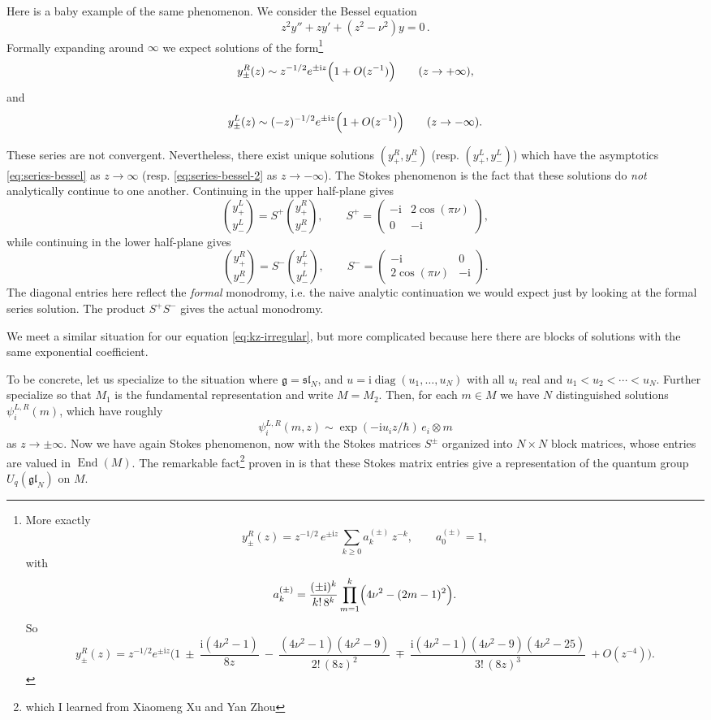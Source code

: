 \documentclass[12pt,letterpaper,reqno]{amsart}
\numberwithin{equation}{section}
\newcommand{\fg}{{\mathfrak g}}
\newcommand{\fgl}{{\mathfrak {gl}}}
\newcommand{\fsl}{{\mathfrak {sl}}}
\newcommand{\I}{{\mathrm i}}
\newcommand{\ti}[1]{\textit{#1}}
\DeclareMathOperator{\End}{End}
\DeclareMathOperator{\diag}{diag}
\begin{document}
Here is a baby example of the same phenomenon. We
consider the Bessel equation
\[
z^{2}y''+zy'+(z^{2}-\nu^{2})y=0 \, .
\]
Formally expanding around $\infty$ we expect solutions of the form\footnote{More exactly
\[
y^R_\pm(z)=z^{-1/2}\,e^{\pm \I z}\,\sum_{k\ge 0} a_k^{(\pm)}\,z^{-k},\qquad a_0^{(\pm)}=1,
\]
with
\[
a_k^{(\pm)}=\frac{(\pm \I)^k}{k!\,8^k}\prod_{m=1}^k\Bigl(4\nu^2-(2m-1)^2\Bigr).
\]
So
\[
y^R_\pm(z)=z^{-1/2}e^{\pm \I z}\Biggl(
1
\ \pm\ \frac{\I(4\nu^2-1)}{8z}
\ -\ \frac{(4\nu^2-1)(4\nu^2-9)}{2!\,(8z)^2}
\ \mp\ \frac{\I(4\nu^2-1)(4\nu^2-9)(4\nu^2-25)}{3!\,(8z)^3}
\ + O(z^{-4})
\Biggr).
\]
}
\[ \label{eq:series-bessel}
y^{R}_{\pm}(z)\sim z^{-1/2}e^{\pm \I z}\Bigl(1+O(z^{-1})\Bigr)\qquad (z\to +\infty),
\]
and
\[ \label{eq:series-bessel-2}
y^{L}_{\pm}(z)\sim (-z)^{-1/2}e^{\pm \I z}\Bigl(1+O(z^{-1})\Bigr)\qquad (z\to -\infty).
\]

These series are not convergent.
Nevertheless, there exist unique solutions $(y^{R}_{+},y^{R}_{-})$ (resp. $(y^{L}_{+},y^{L}_{-})$) which have the
asymptotics \eqref{eq:series-bessel} as $z \to \infty$ (resp. \eqref{eq:series-bessel-2} as $z \to -\infty$). 
The Stokes phenomenon is the fact that 
these solutions do \emph{not} analytically 
continue to one another.
Continuing in the upper half-plane gives
\[
\binom{y^{L}_{+}}{y^{L}_{-}}
=
S^{+}\binom{y^{R}_{+}}{y^{R}_{-}},
\qquad
S^{+}=
\begin{pmatrix}
-\I & 2\cos(\pi\nu)\\
0 & -\I
\end{pmatrix},
\]
while continuing in the lower half-plane gives
\[
\binom{y^{R}_{+}}{y^{R}_{-}}
=
S^{-}\binom{y^{L}_{+}}{y^{L}_{-}},
\qquad
S^{-}=
\begin{pmatrix}
-\I & 0\\
2\cos(\pi\nu) & -\I
\end{pmatrix}.
\]
The diagonal entries here reflect the \ti{formal} monodromy,
i.e. the naive analytic continuation we would expect just by looking
at the formal series solution.
The product $S^+ S^-$ gives the actual monodromy.

We meet a similar situation for our equation \eqref{eq:kz-irregular},
but more complicated because here there are blocks of solutions with the
same exponential coefficient.

To be concrete, let us specialize to the situation where 
$\fg = \fsl_N$, and $u = \I \diag(u_1, \dots, u_N)$ with all $u_i$ real
and $u_1 < u_2 < \cdots < u_N$.
Further specialize so that $M_1$ is the fundamental representation
and write $M = M_2$.
Then, for each $m \in M$ we have $N$ distinguished solutions
$\psi^{L,R}_i(m)$, which have roughly
\begin{equation}
  \psi^{L,R}_i(m,z) \sim \exp(-\I u_i z / \hbar) \, e_i \otimes m
\end{equation}
as $z \to \pm \infty$.
Now we have again Stokes phenomenon, now with the Stokes matrices 
$S^\pm$ organized into $N \times N$ block matrices,
whose entries are valued in $\End(M)$.
The remarkable fact\footnote{which I learned from Xiaomeng Xu and Yan Zhou}
proven in \cite{Xu2020StokesQuantumGroups}
is that these Stokes matrix entries give a representation of 
the quantum group $U_q(\fgl_N)$ on $M$.
\end{document}
